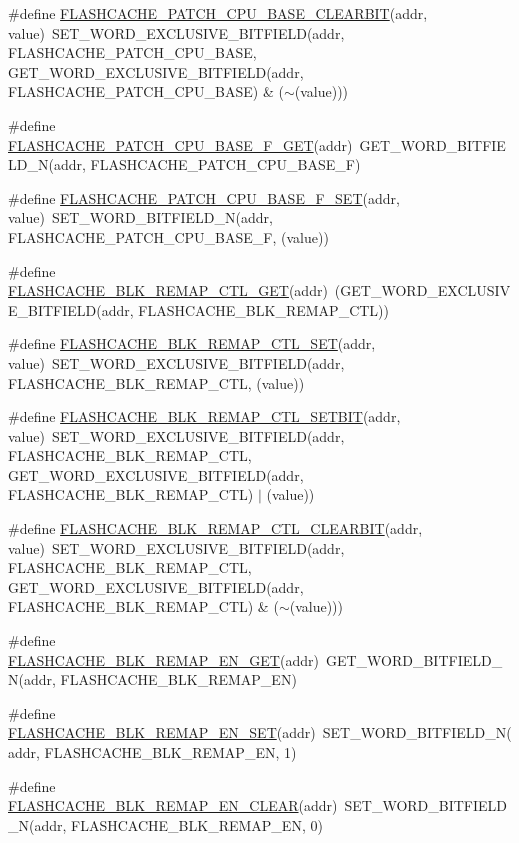 \begin{DoxyCompactItemize}
\item 
\#define \hyperlink{a00549_a4ba5a71bb72140fd7f3a5aec6fffa11a}{FLASHCACHE\_\-PATCH\_\-CPU\_\-BASE\_\-CLEARBIT}(addr, value)~SET\_\-WORD\_\-EXCLUSIVE\_\-BITFIELD(addr, FLASHCACHE\_\-PATCH\_\-CPU\_\-BASE, GET\_\-WORD\_\-EXCLUSIVE\_\-BITFIELD(addr, FLASHCACHE\_\-PATCH\_\-CPU\_\-BASE) \& ($\sim$(value)))
\item 
\#define \hyperlink{a00549_a997825a322ef6669930119fef6b583b1}{FLASHCACHE\_\-PATCH\_\-CPU\_\-BASE\_\-F\_\-GET}(addr)~GET\_\-WORD\_\-BITFIELD\_\-N(addr, FLASHCACHE\_\-PATCH\_\-CPU\_\-BASE\_\-F)
\item 
\#define \hyperlink{a00549_a64431a6b68262b4029f4fe28af118c8a}{FLASHCACHE\_\-PATCH\_\-CPU\_\-BASE\_\-F\_\-SET}(addr, value)~SET\_\-WORD\_\-BITFIELD\_\-N(addr, FLASHCACHE\_\-PATCH\_\-CPU\_\-BASE\_\-F, (value))
\item 
\#define \hyperlink{a00549_a3da41cddc6abb2e7acc141e6ac343972}{FLASHCACHE\_\-BLK\_\-REMAP\_\-CTL\_\-GET}(addr)~(GET\_\-WORD\_\-EXCLUSIVE\_\-BITFIELD(addr, FLASHCACHE\_\-BLK\_\-REMAP\_\-CTL))
\item 
\#define \hyperlink{a00549_a258c93ec24f7518bf185f651895c745b}{FLASHCACHE\_\-BLK\_\-REMAP\_\-CTL\_\-SET}(addr, value)~SET\_\-WORD\_\-EXCLUSIVE\_\-BITFIELD(addr, FLASHCACHE\_\-BLK\_\-REMAP\_\-CTL, (value))
\item 
\#define \hyperlink{a00549_a64cddb65270de900af131f890c0d772a}{FLASHCACHE\_\-BLK\_\-REMAP\_\-CTL\_\-SETBIT}(addr, value)~SET\_\-WORD\_\-EXCLUSIVE\_\-BITFIELD(addr, FLASHCACHE\_\-BLK\_\-REMAP\_\-CTL, GET\_\-WORD\_\-EXCLUSIVE\_\-BITFIELD(addr, FLASHCACHE\_\-BLK\_\-REMAP\_\-CTL) $|$ (value))
\item 
\#define \hyperlink{a00549_af9b692fbe08c9b61a41ffcd0152d8dc8}{FLASHCACHE\_\-BLK\_\-REMAP\_\-CTL\_\-CLEARBIT}(addr, value)~SET\_\-WORD\_\-EXCLUSIVE\_\-BITFIELD(addr, FLASHCACHE\_\-BLK\_\-REMAP\_\-CTL, GET\_\-WORD\_\-EXCLUSIVE\_\-BITFIELD(addr, FLASHCACHE\_\-BLK\_\-REMAP\_\-CTL) \& ($\sim$(value)))
\item 
\#define \hyperlink{a00549_af553ac08a3dcc9221a4965ba46236ed4}{FLASHCACHE\_\-BLK\_\-REMAP\_\-EN\_\-GET}(addr)~GET\_\-WORD\_\-BITFIELD\_\-N(addr, FLASHCACHE\_\-BLK\_\-REMAP\_\-EN)
\item 
\#define \hyperlink{a00549_a7b21e831a9da0f5b2ac2728c05292501}{FLASHCACHE\_\-BLK\_\-REMAP\_\-EN\_\-SET}(addr)~SET\_\-WORD\_\-BITFIELD\_\-N(addr, FLASHCACHE\_\-BLK\_\-REMAP\_\-EN, 1)
\item 
\#define \hyperlink{a00549_a7485032f9bfbefb3eaaf80932547a4fe}{FLASHCACHE\_\-BLK\_\-REMAP\_\-EN\_\-CLEAR}(addr)~SET\_\-WORD\_\-BITFIELD\_\-N(addr, FLASHCACHE\_\-BLK\_\-REMAP\_\-EN, 0)

\end{DoxyCompactItemize}
